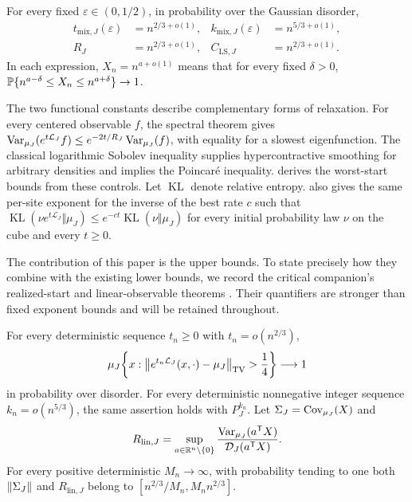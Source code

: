 \begin{theorem}
\label{thm:main}
For every fixed $\varepsilon\in(0,1/2)$, in probability over the Gaussian
disorder,
\begin{align*}
 t_{\mathrm{mix},J}(\varepsilon)&=n^{2/3+o(1)},&
 k_{\mathrm{mix},J}(\varepsilon)&=n^{5/3+o(1)},\\
 R_J&=n^{2/3+o(1)},& C_{\mathrm{LS},J}&=n^{2/3+o(1)}.
\end{align*}
In each expression, $X_n=n^{a+o(1)}$ means that for every fixed
$\delta>0$, $\mathbb P\{n^{a-\delta}\le X_n\le n^{a+\delta}\}\to1$.
\end{theorem}

The two functional constants describe complementary forms of relaxation.
For every centered observable $f$, the spectral theorem gives
$\operatorname{Var}_{\mu_J}(e^{t\mathcal L_J}f)\le e^{-2t/R_J}\operatorname{Var}_{\mu_J}(f)$,
with equality for a slowest eigenfunction. The classical logarithmic
Sobolev inequality supplies hypercontractive smoothing for arbitrary
densities and implies the Poincar\'e inequality. 
derives the worst-start bounds from these controls. Let $\operatorname{KL}$
denote relative entropy.  also gives the
same per-site exponent for the inverse of the best rate $c$ such that
$\operatorname{KL}(\nu e^{t\mathcal L_J}\Vert\mu_J)
\le e^{-ct}\operatorname{KL}(\nu\Vert\mu_J)$
for every initial probability law $\nu$ on the cube and every $t\ge0$.

The contribution of this paper is the upper bounds. To state precisely
how they combine with the existing lower bounds, we record the critical
companion's realized-start and linear-observable theorems
\cite[Theorems~1.2 and~1.3]{AcceptedCritical}. Their quantifiers are
stronger than fixed exponent bounds and will be retained throughout.

\begin{theorem}
\label{thm:accepted-critical}
For every deterministic sequence $t_n\ge0$ with $t_n=o(n^{2/3})$,
\[
 \mu_J\!\left\{x:
 \left\lVert e^{t_n\mathcal L_J}(x,\cdot)-\mu_J\right\rVert_{\mathrm{TV}}>\frac14\right\}
 \longrightarrow1
\]
in probability over disorder. For every deterministic nonnegative integer
sequence $k_n=o(n^{5/3})$, the same assertion holds with $P_J^{k_n}$.
Let $\Sigma_J=\operatorname{Cov}_{\mu_J}(X)$ and
\[
 R_{\mathrm{lin},J}=\sup_{a\in\mathbb R^n\setminus\{0\}}
       \frac{\operatorname{Var}_{\mu_J}(a^{\mathsf T}X)}{\mathcal D_J(a^{\mathsf T}X)}.
\]
For every positive deterministic $M_n\to\infty$, with probability
tending to one both $\left\lVert\Sigma_J\right\rVert$ and $R_{\mathrm{lin},J}$ belong to
$[n^{2/3}/M_n,M_n n^{2/3}]$.
\end{theorem}


